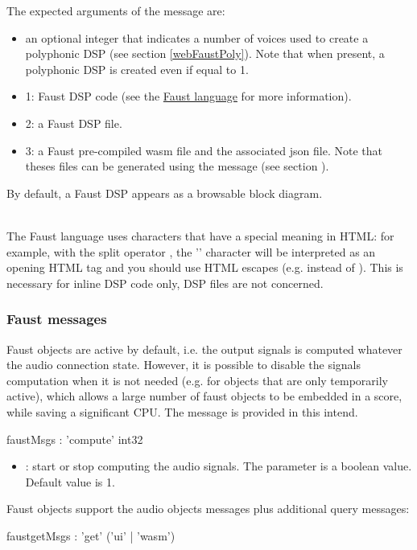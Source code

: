 \documentclass[a4paper,twoside]{article}
\newcommand{\subsublevel}[1]	{\subsubsection{#1}}
\begin{document}
The expected arguments of the  message are:
\begin{itemize}
\item an optional integer that indicates a number of voices used to create a polyphonic DSP (see section \ref{webFaustPoly}). Note that when present, a polyphonic DSP is created even if equal to 1.
\item 1: Faust DSP code (see the \href{https://faustdoc.grame.fr/}{Faust language} for more information).
\item 2: a Faust DSP file.
\item 3: a Faust pre-compiled wasm file and the associated json file. Note that theses files can be generated using the  message (see section ). 
\end{itemize}

By default, a Faust DSP appears as a browsable block diagram.

\note{}\\
The Faust language uses characters that have a special meaning in HTML: for example, with the split operator \OSC{<:}, the '\OSC{<}' character will be interpreted as an opening HTML tag and you should use HTML escapes (e.g.  instead of \OSC{<}). This is necessary for inline DSP code only, DSP files are not concerned.

\subsublevel{Faust messages}
\label{webFaustMsgs}

Faust objects are active by default, i.e. the output signals is computed whatever the audio connection state. 
However, it is possible to disable the signals computation when it is not needed (e.g. for objects that are only temporarily active), which allows a large number of faust objects to be embedded in a score, while saving a significant CPU. The  message is provided in this intend.

\begin{rail}
faustMsgs : 'compute' int32
\end{rail}

\begin{itemize}
\item {}: start or stop computing the audio signals. The parameter is a boolean value. Default value is 1.
\end{itemize}

Faust objects support the audio objects messages plus additional query messages:

\begin{rail}
faustgetMsgs : 'get' ('ui' | 'wasm')
\end{rail}
\end{document}
